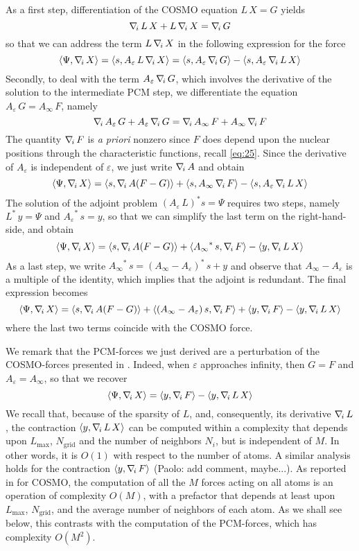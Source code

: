 As a first step, differentiation of the COSMO equation $L\, X = G$ yields
\[
\nabla_{\!i}\, L \, X + L \, \nabla_{\!i}\, X = \nabla_{\!i}\, G
\]
so that we can address the term $L \, \nabla_{\!i}\, X$ in the following expression for the force
\[
\langle \Psi , \nabla_{\!i}\, X\rangle  = \langle s ,  A_\varepsilon \, L \, \nabla_{\!i}\, X\rangle
 = \langle s ,  A_\varepsilon \, \nabla_{\!i}\, G \rangle - \langle s , A_\varepsilon \, \nabla_{\!i}\, L \,  X \rangle
\]
Secondly, to deal with the term $A_\varepsilon \, \nabla_{\!i}\, G$, which involves the derivative of the solution to the intermediate PCM step, we differentiate the equation $A_\varepsilon \, G = A_\infty \, F$, namely
\[
\nabla_{\!i}\, A_\varepsilon \, G + A_\varepsilon \, \nabla_{\!i}\, G = \nabla_{\!i}\, A_\infty \, F + A_\infty \, \nabla_{\!i}\, F
\]
The quantity $\nabla_{\!i}\, F$ is \emph{a priori} nonzero since $F$ does depend upon the nuclear positions through the characteristic functions, recall \eqref{eq:25}. Since the derivative of $A_\varepsilon$ is independent of $\varepsilon$, we just write $\nabla_{\!i}\, A$ and obtain
\[
\langle \Psi , \nabla_{\!i}\, X\rangle = \langle s , \nabla_{\!i}\,  A ( F - G ) \rangle + \langle  s ,{A_\infty}\, \nabla_{\!i}\, F \rangle - \langle  s , {A_\varepsilon}\, \nabla_{\!i}\, L \,  X \rangle
\]
The solution of the adjoint problem $(A_\varepsilon \, L )^* s = \Psi$ requires two steps, namely ${L}^* \, y = \Psi$ and ${A_\varepsilon}^* \, s = y$, so that we can simplify the last term on the right-hand-side, and obtain
\[
\langle \Psi , \nabla_{\!i}\, X\rangle = \langle s , \nabla_{\!i}\,  A ( F - G ) \rangle + \langle {A_\infty}^*\, s , \nabla_{\!i}\, F \rangle - \langle  y , \nabla_{\!i}\, L \,  X \rangle
\]
As a last step, we write ${A_\infty}^*\, s = ({A_\infty}-{A_\varepsilon})^*\, s + y$ and observe that ${A_\infty}-{A_\varepsilon} $ is a multiple of the identity, which implies that the adjoint is redundant. The final expression becomes
\[
\langle \Psi , \nabla_{\!i}\, X\rangle = \langle s , \nabla_{\!i}\,  A ( F - G ) \rangle + \langle ({A_\infty}-{A_\varepsilon})\, s, \nabla_{\!i}\, F \rangle +\langle y , \nabla_{\!i}\, F \rangle - \langle  y , \nabla_{\!i}\, L \,  X \rangle
\]
where the last two terms coincide with the COSMO force.

We remark that the PCM-forces we just derived are a perturbation of the COSMO-forces presented in \cite{Lipparini_JCTC_ddCOSMO}. Indeed, when $\varepsilon$ approaches infinity, then $G = F$ and $A_\varepsilon = {A_\infty} $, so that we recover
\[
\langle \Psi , \nabla_{\!i}\, X\rangle =  \langle y , \nabla_{\!i}\, F \rangle - \langle y , \nabla_{\!i}\, L \,  X \rangle
\]
We recall that, because of the sparsity of $L$, and, consequently, its derivative $\nabla_{\!i}\, L$, the contraction $\langle y ,\nabla_{\!i}\, L \, X\rangle$ can be computed within a complexity that depends upon $L_\text{max}$, $N_\text{grid}$ and the number of neighbors $N_i$, but is independent of $M$. In other words, it is $O(1)$ with respect to the number of atoms. A similar analysis holds for the contraction $\langle y , \nabla_{\!i}\, F \rangle$ {\color{red} (Paolo: add comment, maybe...)}. As reported in \cite{Lipparini_JCTC_ddCOSMO} for COSMO, the computation of all the $M$ forces acting on all atoms is an operation of complexity $O(M)$, with a prefactor that depends at least upon $L_\text{max}$, $N_\text{grid}$, and the average number of neighbors of each atom. As we shall see below, this contrasts with the computation of the PCM-forces, which has complexity $O(M^2)$.

